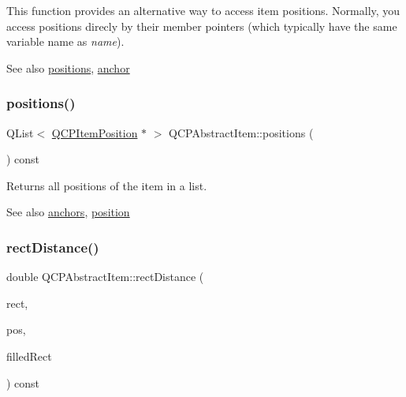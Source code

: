 This function provides an alternative way to access item positions. Normally, you access positions direcly by their member pointers (which typically have the same variable name as {\itshape name}).

\begin{DoxySeeAlso}{See also}
\hyperlink{class_q_c_p_abstract_item_a709f655ac3f7f22d452714134662b454}{positions}, \hyperlink{class_q_c_p_abstract_item_a139c255ea8831642fac91748e29a5adb}{anchor} 
\end{DoxySeeAlso}
\mbox{\label{class_q_c_p_abstract_item_a709f655ac3f7f22d452714134662b454}} 
\subsubsection{\texorpdfstring{positions()}{positions()}}
{\footnotesize\ttfamily Q\+List$<$ \hyperlink{class_q_c_p_item_position}{Q\+C\+P\+Item\+Position} $\ast$ $>$ Q\+C\+P\+Abstract\+Item\+::positions (\begin{DoxyParamCaption}{ }\end{DoxyParamCaption}) const\hspace{0.3cm}{\ttfamily [inline]}}

Returns all positions of the item in a list.

\begin{DoxySeeAlso}{See also}
\hyperlink{class_q_c_p_abstract_item_a81d1ecfea3368b836cf9675a0045e659}{anchors}, \hyperlink{class_q_c_p_abstract_item_a2589c3d298f9a576d77d9addb440a18d}{position} 
\end{DoxySeeAlso}
\mbox{\label{class_q_c_p_abstract_item_a7dfc2007e36d09b8b5c988a9f06d6a7e}} 
\subsubsection{\texorpdfstring{rect\+Distance()}{rectDistance()}}
{\footnotesize\ttfamily double Q\+C\+P\+Abstract\+Item\+::rect\+Distance (\begin{DoxyParamCaption}\item[{const Q\+RectF \&}]{rect,  }\item[{const Q\+PointF \&}]{pos,  }\item[{bool}]{filled\+Rect }\end{DoxyParamCaption}) const\hspace{0.3cm}{\ttfamily [protected]}}

